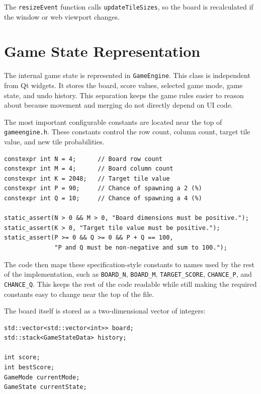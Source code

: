 \documentclass[a4paper,12pt]{article}
\begin{document}
The \texttt{resizeEvent} function calls \texttt{updateTileSizes}, so the board is recalculated if the window or web viewport changes.

\section{Game State Representation}

The internal game state is represented in \texttt{GameEngine}. This class is independent from Qt widgets. It stores the board, score values, selected game mode, game state, and undo history. This separation keeps the game rules easier to reason about because movement and merging do not directly depend on UI code.

The most important configurable constants are located near the top of \texttt{gameengine.h}. These constants control the row count, column count, target tile value, and new tile probabilities.

\begin{lstlisting}[style=CppStyle,caption={Configurable game constants}]
constexpr int N = 4;      // Board row count
constexpr int M = 4;      // Board column count
constexpr int K = 2048;   // Target tile value
constexpr int P = 90;     // Chance of spawning a 2 (%)
constexpr int Q = 10;     // Chance of spawning a 4 (%)

static_assert(N > 0 && M > 0, "Board dimensions must be positive.");
static_assert(K > 0, "Target tile value must be positive.");
static_assert(P >= 0 && Q >= 0 && P + Q == 100,
              "P and Q must be non-negative and sum to 100.");
\end{lstlisting}

The code then maps these specification-style constants to names used by the rest of the implementation, such as \texttt{BOARD\_N}, \texttt{BOARD\_M}, \texttt{TARGET\_SCORE}, \texttt{CHANCE\_P}, and \texttt{CHANCE\_Q}. This keeps the rest of the code readable while still making the required constants easy to change near the top of the file.

The board itself is stored as a two-dimensional vector of integers:

\begin{lstlisting}[style=CppStyle,caption={Board and state fields in GameEngine}]
std::vector<std::vector<int>> board;
std::stack<GameStateData> history;

int score;
int bestScore;
GameMode currentMode;
GameState currentState;
\end{lstlisting}
\end{document}
